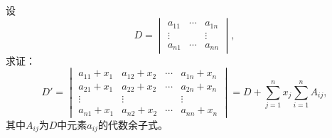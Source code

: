 \begin{ex} \label{ex:2.17}
设
$$D = \begin{vmatrix} a_{11} & \cdots & a_{1n} \\ \vdots & & \vdots \\ a_{n1} & \cdots & a_{nn} \end{vmatrix},$$
求证：
$$D' = \begin{vmatrix} a_{11}+x_1 & a_{12}+x_2 & \cdots & a_{1n}+x_n \\ a_{21}+x_1 & a_{22}+x_2 & \cdots & a_{2n}+x_n \\ \vdots & \vdots & & \vdots \\ a_{n1}+x_1 & a_{n2}+x_2 & \cdots & a_{nn}+x_n \end{vmatrix} = D + \sum\limits_{j=1}^n x_j \sum\limits_{i=1}^n A_{ij},$$
其中$A_{ij}$为$D$中元素$a_{ij}$的代数余子式。
\end{ex}

